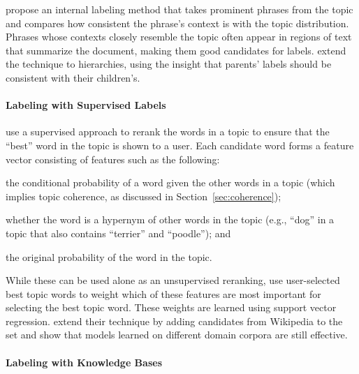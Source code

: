 \citet{mei-07} propose an internal labeling method that takes
prominent phrases from the topic and compares how consistent the
phrase's context is with the topic distribution.  Phrases whose
contexts closely resemble the topic often appear in regions of text
that summarize the document, making them good candidates for labels.
\citet{mao-12} extend the technique to hierarchies, using the insight
that parents' labels should be consistent with their children's.



\paragraph{Labeling with Supervised Labels}


\citet{lau-10} use a supervised approach to rerank the words in a
topic to ensure that the ``best'' word in the topic is shown to a
user. Each candidate word forms a feature vector consisting of
features such as the following:
\begin{itemize*}
\item the conditional probability of a word given the other words in a
  topic (which implies topic coherence, as discussed in
  Section~\ref{sec:coherence});
\item whether the word is a hypernym of other words in the topic
  (e.g., ``dog'' in a topic that also contains ``terrier'' and
  ``poodle''); and
\item the original probability of the word in the topic.
\end{itemize*}

While these can be used alone as an unsupervised reranking,
\citet{lau-10} use user-selected best topic words to weight which of
these features are most important for selecting the best topic word.
These weights are learned using support vector regression.
\citet{lau-11} extend their technique by adding candidates from
Wikipedia to the set and show that models learned on different domain
corpora are still effective.

\paragraph{Labeling with Knowledge Bases}

